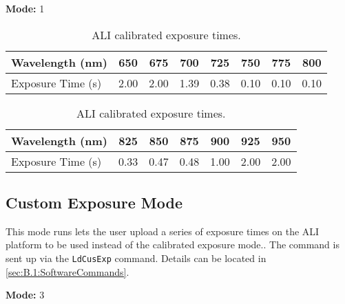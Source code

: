 \textbf{Mode:} 1

\begin{table}
    \begin{center}
    \begin{tabular}{|l|c|c|c|c|c|c|c|}
    \hline
    Wavelength (nm) & 650 & 675 & 700 & 725 & 750 & 775 & 800 \\
    \hline
    Exposure Time (s) & 2.00 & 2.00 & 1.39 & 0.38 & 0.10 & 0.10 & 0.10 \\
    \hline
    \end{tabular}
    \vspace{5mm}
    \begin{tabular}{|l|c|c|c|c|c|c|}
    \hline
    Wavelength (nm) & 825 & 850 & 875 & 900 & 925 & 950 \\
    \hline
    Exposure Time (s) & 0.33 & 0.47 & 0.48 & 1.00 & 2.00 & 2.00 \\
    \hline
    \end{tabular}
    \end{center}
    \caption[ALI Calibrated Exposure Times]{ALI calibrated exposure times.}
    \label{tab:B.2:O2ScienceModes}
\end{table}

\subsection{Custom Exposure Mode}

This mode runs lets the user upload a series of exposure times on the ALI platform to be used instead of the calibrated exposure mode.. The command is sent up via the \texttt{LdCusExp} command. Details can be located in \autoref{sec:B.1:SoftwareCommands}.

\textbf{Mode:} 3 